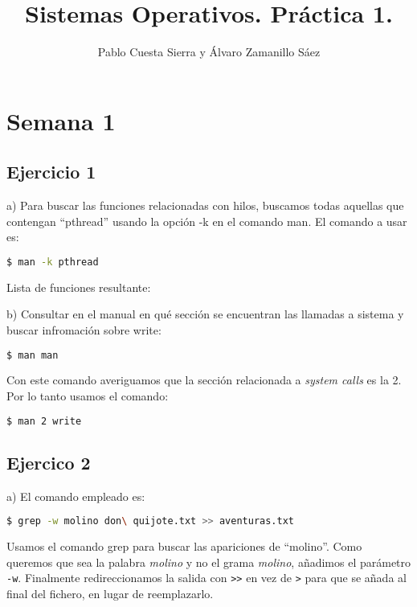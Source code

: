 \documentclass{article}
\title{Sistemas Operativos. Práctica 1.}
\author{Pablo Cuesta Sierra y Álvaro Zamanillo Sáez }
\date{}
\begin{document}
\maketitle


\section*{Semana 1}
\subsection*{Ejercicio 1}

a) Para buscar las funciones relacionadas con hilos, buscamos todas aquellas que contengan ``pthread'' usando la opción -k en el comando man. El comando a usar es: 

\begin{lstlisting}[language=bash]
$ man -k pthread
\end{lstlisting}

Lista de funciones resultante: 



b) Consultar en el manual en qué sección se encuentran las llamadas a sistema y buscar infromación sobre write:

\begin{lstlisting}[language=bash]
$ man man
\end{lstlisting}

Con este comando averiguamos que la sección relacionada a \textit{system calls} es la 2. Por lo tanto usamos el comando:

\begin{lstlisting}[language=bash]
$ man 2 write
\end{lstlisting}

\subsection*{Ejercico 2}


a) El comando empleado es: 

\begin{lstlisting}[language=bash]
$ grep -w molino don\ quijote.txt >> aventuras.txt
\end{lstlisting}

Usamos el comando grep para buscar las apariciones de ``molino''. Como queremos que sea la palabra \textit{molino} y no el grama \textit{molino}, añadimos el parámetro \texttt{-w}. Finalmente redireccionamos la salida con \texttt {>}\texttt {>} en vez de \texttt {>} para que se añada al final del fichero, en lugar de reemplazarlo.
\end{document}

